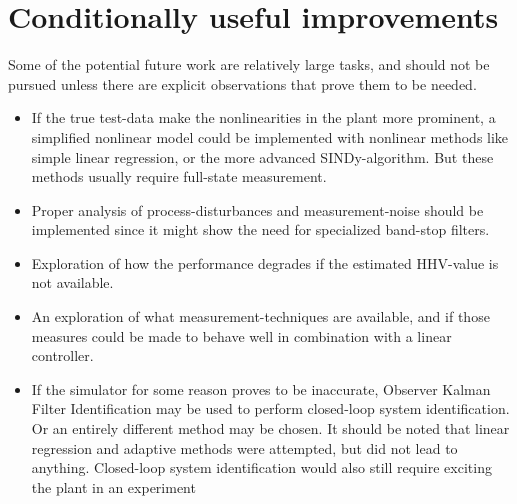 \section{Conditionally useful improvements}
Some of the potential future work are relatively large tasks, and should not be pursued unless there are explicit observations that prove them to be needed. 
\begin{itemize}
    \item If the true test-data make the nonlinearities in the plant more prominent, a simplified nonlinear model could be implemented with nonlinear methods like simple linear regression, or the more advanced SINDy-algorithm. But these methods usually require full-state measurement. 
    \item Proper analysis of process-disturbances and measurement-noise should be implemented since it might show the need for specialized band-stop filters. 
    \item Exploration of how the performance degrades if the estimated HHV-value is not available. 
    \item An exploration of what measurement-techniques are available, and if those measures could be made to behave well in combination with a linear controller. 
    \item If the simulator for some reason proves to be inaccurate, Observer Kalman Filter Identification may be used to perform closed-loop system identification. Or an entirely different method may be chosen. It should be noted that linear regression and adaptive methods were attempted, but did not lead to anything. Closed-loop system identification would also still require exciting the plant in an experiment
\end{itemize}


